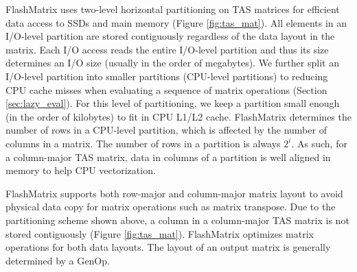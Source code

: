 FlashMatrix uses two-level horizontal partitioning on TAS matrices for efficient
data access to SSDs and main memory (Figure \ref{fig:tas_mat}). All elements in
an I/O-level partition
are stored contiguously regardless of the data layout in the matrix. Each I/O
access reads the entire I/O-level partition and thus its size determines an I/O
size (usually in the order of megabytes). We further split an I/O-level partition
into smaller partitions (CPU-level partitions) to reducing CPU cache misses
when evaluating a sequence of matrix
operations (Section \ref{sec:lazy_eval}). For this level of partitioning, we keep
a partition small enough (in the order of kilobytes) to fit in CPU L1/L2 cache.
FlashMatrix determines the number of rows in a CPU-level partition, which is
affected by the number of columns in a matrix. The number of rows in a partition
is always $2^i$. As such, for a column-major TAS matrix, data in columns of
a partition is well aligned in memory to help CPU vectorization.


FlashMatrix supports both row-major and column-major matrix layout to avoid
physical data copy for matrix operations such as matrix transpose. Due to
the partitioning scheme shown above, a column in a column-major TAS matrix
is not stored contiguously (Figure \ref{fig:tas_mat}). FlashMatrix optimizes
matrix operations for both data layouts.
The layout of an output matrix is generally determined by a GenOp.

